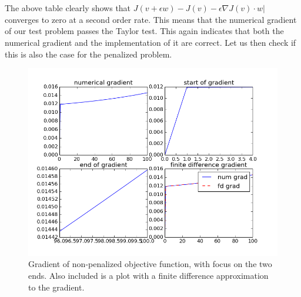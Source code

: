 \\
\\
The above table clearly shows that $J(v+\epsilon w)-J(v)-\epsilon \nabla J(v)\cdot w|$ converges to zero at a second order rate. This means that the numerical gradient of our test problem passes the Taylor test. This again indicates that both the numerical gradient and the implementation of it are correct. Let us then check if this is also the case for the penalized problem.
\begin{figure}[h]
\caption{Gradient of non-penalized objective function, with focus on the two ends. Also included is a plot with a finite difference approximation to the gradient.}
\centering
\includegraphics[scale=0.5]{num_grad.png}
\end{figure}
